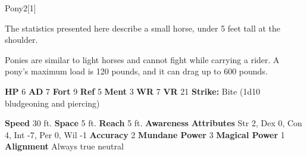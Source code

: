   \begin{monsection}{Pony}{2}[1]
    \vspace{-1em}\vspace{-1em}
    \vspace{0em}

    
      The statistics presented here describe a small horse, under 5 feet tall at the shoulder.
    
        Ponies are similar to light horses and cannot fight while carrying a rider.
        A pony's maximum load is 120 pounds, and it can drag up to 600 pounds.
      

    \begin{spellcontent}
      \begin{spelltargetinginfo}
        \pari \textbf{HP} 6 \monsep
          \textbf{AD} 7 \monsep
          \textbf{Fort} 9 \monsep
          \textbf{Ref} 5 \monsep
          \textbf{Ment} 3
        \pari \textbf{WR} 7 \monsep
        \textbf{VR} 21
        \pari \textbf{Strike:}
            Bite  (1d10 bludgeoning and piercing)
      \end{spelltargetinginfo}
    \end{spellcontent}
    \begin{monsterfooter}
      \pari \textbf{Speed} 30 ft. \monsep
        \textbf{Space} 5 ft. \monsep
        \textbf{Reach} 5 ft.
      \pari \textbf{Awareness} 
      \pari \textbf{Attributes}
        Str 2, Dex 0,
        Con 4, Int -7,
        Per 0, Wil -1
      \pari \textbf{Accuracy} 2 \monsep
        \textbf{Mundane Power} 3 \monsep
      \textbf{Magical Power} 1
      \pari \textbf{Alignment} Always true neutral
    \end{monsterfooter}
  \end{monsection}
  
